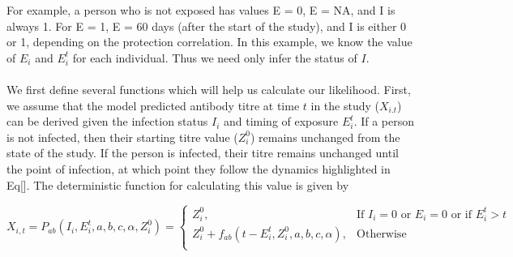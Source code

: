 \documentclass{article}
\begin{document}
\begin{table}[ht]
\label{tab:states}
    \centering
    \caption{Inferrable epidemiological states}
\end{table}

For example, a person who is not exposed has values E = 0, E = NA, and I is always 1. For E = 1, E = 60 days (after the start of the study), and I is either 0 or 1, depending on the protection correlation. In this example, we know the value of $E_i$ and $E_i^t$ for each individual. Thus we need only infer the status of $I$. 

\paragraph{}We first define several functions which will help us calculate our likelihood. First, we assume that the model predicted antibody titre at time $t$ in the study ($X_{i.t}$) can be derived given the infection status $I_i$ and timing of exposure $E_i^t$. If a person is not infected, then their starting titre value ($Z^0_i$) remains unchanged from the state of the study. If the person is infected, their titre remains unchanged until the point of infection, at which point they follow the dynamics highlighted in Eq[]. The deterministic function for calculating this value is given by

\begin{equation}
\label{eq:ll_abkin}
X_{i,t}  = P_{ab}( I_i,  E_i^t, a, b, c, \alpha, Z^0_i) = 
	\begin{cases}
	Z^0_i, & \text{If $I_i = 0$ or $E_i = 0$ or if $E_i^t > t$} \\ 
	Z^0_i + f_{ab}(t - E_i^t, Z^0_i,  a, b, c,  \alpha),  & \text{Otherwise} \\
	\end{cases}
\end{equation}
\end{document}
